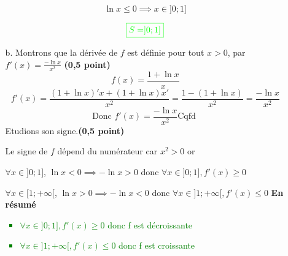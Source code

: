 \documentclass[12pt]{article}
\begin{document}
\begin{enumerate}
\begin{itemize}
$$\ln x \leq 0\implies x\in]0; 1]$$

$$\textcolor{green}{\boxed{S=]0; 1]}}$$
\item[b.] Montrons que la dérivée de $f$ est définie pour tout $x>0$, par $f'(x)=\frac{-\ln x}{x^{2}}$ \textbf{(0,5 point)}
$$ f(x)=\frac{1+\ln x}{x} $$
$$ f'(x)=\frac{(1+\ln x)'x+(1+\ln x)x'}{x^{2}}=\frac{1-(1+\ln x)}{x^{2}}=\frac{-\ln x}{x^{2}} $$
$$ \text{Donc }f'(x)=\frac{-\ln x}{x^{2}} \text{Cqfd } $$
Etudions son signe.\textbf{(0,5 point)}

Le signe de $f$ dépend du numérateur car $x^{2}>0$ or 

$\forall x\in]0; 1]$, $\ln x <0\implies -\ln x >0$ donc $\forall x\in]0; 1], f'(x)\geq 0$

$\forall x\in[1; +\infty[$, $\ln x >0\implies -\ln x <0$ donc $\forall x\in]1; +\infty[, f'(x)\leq 0$
\newpage
\textbf{En résumé}
\textcolor{green}{
\begin{itemize}
\item $\forall x\in]0; 1], f'(x)\geq 0$ donc f est décroissante
\item $\forall x\in]1; +\infty[, f'(x)\leq 0$ donc f est croissante
\end{itemize}
}

\end{itemize}
\end{enumerate}
\end{document}
